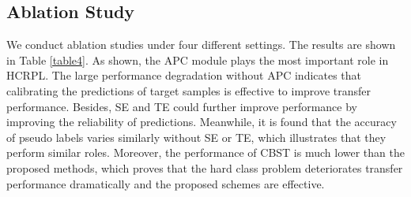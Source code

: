 \documentclass[a4paper,fleqn]{cas-dc}
\begin{document}
	
	\subsection{Ablation Study}
	We conduct ablation studies under four different settings. The results are shown in Table \ref{table4}. As shown, the APC module plays the most important role in HCRPL. The large performance degradation without APC indicates that calibrating the predictions of target samples is effective to improve transfer performance. Besides, SE and TE could further improve performance by improving the reliability of predictions. Meanwhile, it is found that the accuracy of pseudo labels varies similarly without SE or TE, which illustrates that they perform similar roles. Moreover, the performance of CBST is much lower than the proposed methods, which proves that the hard class problem deteriorates transfer performance dramatically and the proposed schemes are effective.

	
	
\end{document}
